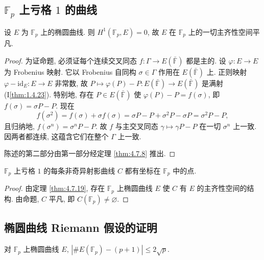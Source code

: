 \subsection*{$\mathbb{F}_p$ 上亏格 $1$ 的曲线}

\begin{proposition} \label{thm:4.9.2} 
设 $E$ 为 $\mathbb{F}_p$ 上的椭圆曲线. 则 $H^1(\mathbb{F}_p, E) = 0$, 故 $E$ 在 $\mathbb{F}_p$ 上的一切主齐性空间平凡.
\end{proposition}

\begin{proof}
为证命题, 必须证每个连续交叉同态 $f\colon\Gamma\to E(\bar{\mathbb{F}})$ 都是主的. 设 $\varphi\colon E\to E$ 为 Frobenius 映射. 它以 Frobenius 自同构 $\sigma\in\Gamma$ 作用在 $E(\bar{\mathbb{F}})$ 上. 正则映射 $\varphi - \mathrm{id}_E\colon E\to E$ 非常数, 故 $P\mapsto\varphi(P) - P\colon E(\bar{\mathbb{F}})\to E(\bar{\mathbb{F}})$ 是满射 (I\ref{thm:1.4.23}). 特别地, 存在 $P\in E(\bar{\mathbb{F}})$ 使 $\varphi(P) - P = f(\sigma)$, 即 $f(\sigma) = \sigma P - P$. 现在
\[
f(\sigma^2) = f(\sigma) + \sigma f(\sigma) = \sigma P - P + \sigma^2P - \sigma P = \sigma^2P - P,
\]
且归纳地, $f(\sigma^n) = \sigma^nP - P$. 故 $f$ 与主交叉同态 $\gamma\mapsto\gamma P - P$ 在一切 $\sigma^n$ 上一致. 因两者都连续, 这蕴含它们在整个 $\Gamma$ 上一致.

陈述的第二部分由第一部分经定理 \ref{thm:4.7.8} 推出.
\end{proof}

\begin{corollary} \label{thm:4.9.3} 
$\mathbb{F}_p$ 上亏格 $1$ 的每条非奇异射影曲线 $C$ 都有坐标在 $\mathbb{F}_p$ 中的点.
\end{corollary}

\begin{proof}
由定理 \ref{thm:4.7.19}, 存在 $\mathbb{F}_p$ 上椭圆曲线 $E$ 使 $C$ 有 $E$ 的主齐性空间的结构. 由命题, $C$ 平凡, 即 $C(\mathbb{F}_p)\neq\varnothing$.
\end{proof}

\subsection*{椭圆曲线 Riemann 假设的证明}

\begin{theorem}[Riemann 假设] \label{thm:4.9.4} 
对 $\mathbb{F}_p$ 上椭圆曲线 $E$, $|\#E(\mathbb{F}_p) - (p+1)|\le 2\sqrt{p}$.
\end{theorem}

